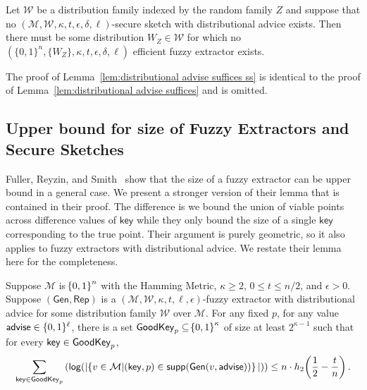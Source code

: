 \begin{lemma}
Let $\mathcal{W}$ be a distribution family indexed by the random family $Z$ and suppose that no $(\mathcal{M}, \mathcal{W}, \kappa, t, \epsilon, \delta, \ell)$-secure sketch with distributional advice exists.  Then there must be some distribution $W_Z \in \mathcal{W}$ for which no  $(\{0,1\}^n, \{W_Z\}, \kappa, t, \epsilon, \delta, \ell)$ efficient fuzzy extractor exists.
\label{lem:distributional advise suffices ss}
\end{lemma}

\noindent
The proof of Lemma~\ref{lem:distributional advise suffices ss} is identical to the proof of Lemma~\ref{lem:distributional advise suffices} and is omitted.

\subsection{Upper bound for size of Fuzzy Extractors and Secure Sketches}
Fuller, Reyzin, and Smith~\cite{fuller2016fuzzy,fuller2020fuzzy} show that the size of a fuzzy extractor can be upper bound in a general case.  We present a stronger version of their lemma that is contained in their proof.  The difference is we bound the union of viable points across difference values of $\mathsf{key}$ while they only bound the size of a single $\mathsf{key}$ corresponding to the true point.  Their argument is purely geometric, so it also applies to fuzzy extractors with distributional advice. 
We restate their lemma here for the completeness. 

\begin{lemma}
    \label{lem:smallgeneralviable}
    Suppose $\mathcal{M}$ is $\!\left\{ 0,1 \right\}^{n}$ with the Hamming Metric, $\kappa \geq 2$, $0 \leq t \leq n/2$, and $\epsilon > 0$. 
    Suppose $(\mathsf{Gen, Rep})$ is a $(\mathcal{M,W},\kappa, t, \ell, \epsilon)$-fuzzy extractor with distributional advice for some distribution family $\mathcal{W}$ over $\mathcal{M}$. 
    For any fixed $p$, for any value ${\mathsf{advise}} \in \{0, 1\}^\ell$, there is a set $\mathsf{GoodKey}_p \subseteq \!\left\{ 0,1 \right\}^{\kappa}$ of size at least $2^{\kappa - 1}$ such that for every $\mathsf{key} \in \mathsf{GoodKey}_p$,
    \[
       \sum_{\mathsf{key} \in \mathsf{GoodKey}_p} \left( \mathsf{log}\!\left(|\!\left\{ v \in \mathcal{M}|\!\left(\mathsf{key}, p\right) \in \mathsf{supp}\!\left(\mathsf{Gen}(v, {\mathsf{advise}})\right) \right\}|\right)\right) \leq n \cdot h_2\!\left(\frac{1}{2} - \frac{t}{n}\right).
    \]   
\end{lemma}


